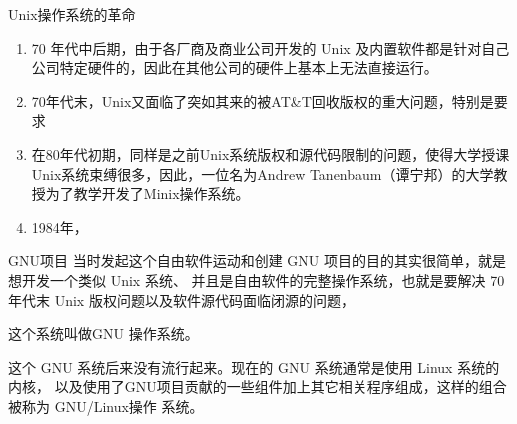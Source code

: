 \begin{ascolorbox17}{Unix操作系统的革命}
	\begin{enumerate}
		\item 70 年代中后期，由于各厂商及商业公司开发的 Unix 及内置软件都是针对自己公司特定硬件的，因此在其他公司的硬件上基本上无法直接运行。
		\item 70年代末，Unix又面临了突如其来的被AT\&T回收版权的重大问题，特别是要求
		\item 在80年代初期，同样是之前Unix系统版权和源代码限制的问题，使得大学授课Unix系统束缚很多，因此，一位名为Andrew Tanenbaum（谭宁邦）的大学教授为了教学开发了Minix操作系统。
		\item 1984年，
	\end{enumerate}
\end{ascolorbox17}

\begin{ascboxY}{GNU项目}
当时发起这个自由软件运动和创建 GNU 项目的目的其实很简单，就是想开发一个类似 Unix 系统、 并且是自由软件的完整操作系统，也就是要解决 70 年代末 Unix 版权问题以及软件源代码面临闭源的问题，

这个系统叫做GNU 操作系统。

这个 GNU 系统后来没有流行起来。现在的 GNU 系统通常是使用 Linux 系统的内核， 以及使用了GNU项目贡献的一些组件加上其它相关程序组成，这样的组合被称为 GNU/Linux操作 系统。
\end{ascboxY}

